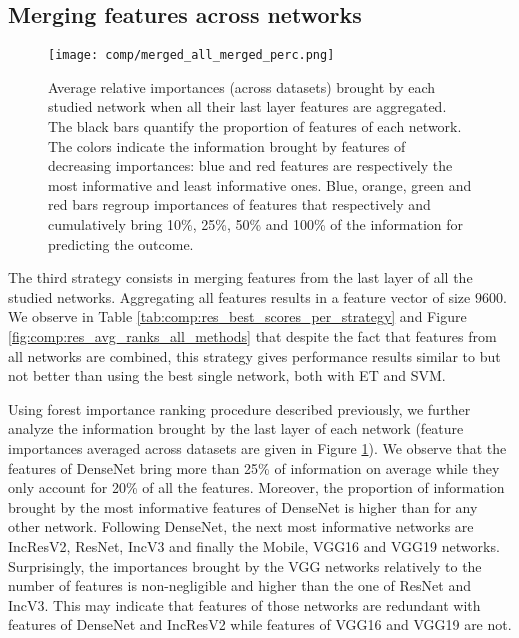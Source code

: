 \subsection{Merging features across networks}
\label{ssec:comp:exp_merge_net}


 \begin{figure}
     \center 
     \texttt{[image: comp/merged\_all\_merged\_perc.png]}
     \caption{Average relative importances (across datasets) brought by each studied network when all their last layer features are aggregated. The black bars quantify the proportion of features of each network. The colors indicate the information brought by features of decreasing importances: blue and red features are respectively the most informative and least informative ones. Blue, orange, green and red bars regroup importances of features that respectively and cumulatively bring 10\%, 25\%, 50\% and 100\% of the information for predicting the outcome.}
     \label{fig:comp:models_merged_avg_imp}
 \end{figure}


The third strategy consists in merging features from the last layer of all the studied networks. Aggregating all features results in a feature vector of size $9600.$ We observe in Table \ref{tab:comp:res_best_scores_per_strategy} and Figure \ref{fig:comp:res_avg_ranks_all_methods} that despite the fact that features from all networks are combined, this strategy gives performance results similar to but not better than using the best single network, both with ET and SVM.

Using forest importance ranking procedure described previously, we further analyze the information brought by the last layer of each network (feature importances averaged across datasets are given in Figure \ref{fig:comp:models_merged_avg_imp}). We observe that the features of DenseNet bring more than 25\% of information on average while they only account for 20\% of all the features. Moreover, the proportion of information brought by the most informative features of DenseNet is higher than for any other network. Following DenseNet, the next most informative networks are IncResV2, ResNet, IncV3 and finally the Mobile, VGG16 and VGG19 networks. 
Surprisingly, the importances brought by the VGG networks relatively to the number of features is non-negligible and higher than the one of ResNet and IncV3. This may indicate that features of those networks are redundant with features of DenseNet and IncResV2 while features of VGG16 and VGG19 are not.



